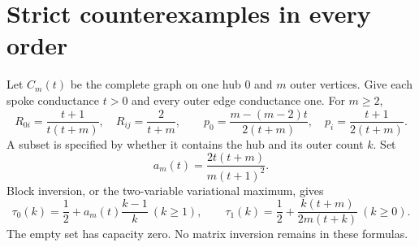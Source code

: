 \documentclass[11pt,a4paper]{article}
\begin{document}
\section{Strict counterexamples in every order}
Let $C_m(t)$ be the complete graph on one hub $0$ and $m$ outer vertices. Give each spoke conductance $t>0$ and every outer edge conductance one. For $m\ge2$,
\begin{equation}\label{eq:cp}
R_{0i}=\frac{t+1}{t(t+m)},\quad R_{ij}=\frac2{t+m},\qquad
p_0=\frac{m-(m-2)t}{2(t+m)},\quad
p_i=\frac{t+1}{2(t+m)}.
\end{equation}
A subset is specified by whether it contains the hub and its outer count $k$. Set
\[
a_m(t)=\frac{2t(t+m)}{m(t+1)^2}.
\]
Block inversion, or the two-variable variational maximum, gives
\begin{equation}\label{eq:capacities}
\tau_0(k)=\frac12+a_m(t)\frac{k-1}{k}\ (k\ge1),\qquad
\tau_1(k)=\frac12+\frac{k(t+m)}{2m(t+k)}\ (k\ge0).
\end{equation}
The empty set has capacity zero. No matrix inversion remains in these formulas.
\end{document}
